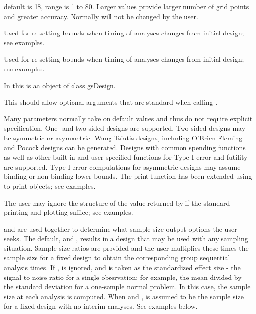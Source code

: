 \begin{Arguments}
\begin{ldescription}
default is 18, range is 1 to 80. 
Larger values provide larger number of grid points and greater accuracy.
Normally  will not be changed by the user.
\item[\code{n.I}] Used for re-setting bounds when timing of analyses changes from initial design; see examples.
\item[\code{maxn.IPlan}] Used for re-setting bounds when timing of analyses changes from initial design; see examples.
\item[\code{x}] In  this is an object of class gsDesign.
\item[\code{...}] This should allow optional arguments that are standard when calling .
\end{ldescription}
\end{Arguments}
\begin{Details}\relax
Many parameters normally take on default values and thus do not require explicit specification.
One- and two-sided designs are supported. Two-sided designs may be symmetric or asymmetric.
Wang-Tsiatis designs, including O'Brien-Fleming and Pocock designs can be generated.
Designs with common spending functions as well as other built-in and user-specified functions for Type I error and 
futility are supported.
Type I error computations for asymmetric designs may assume binding or non-binding lower bounds.
The print function has been extended using  to print  objects; see examples.

The user may ignore the structure of the value returned by  if the standard
printing and plotting suffice; see examples.

 and  are used together to determine what sample size output options the user seeks.
The default,  and , results in a  design that may be used with any sampling
situation. Sample size ratios are provided and the user multiplies these times the sample size for a fixed design
to obtain the corresponding group sequential analysis times. If ,  is ignored, and 
 is taken as the standardized effect size - the signal to noise ratio for a single observation;
for example, the mean divided by the standard deviation for a one-sample normal problem. 
In this case, the sample size at each analysis is computed. 
When  and ,  is assumed to be the sample size for a fixed design
with no interim analyses. See examples below. 


\end{Details}
